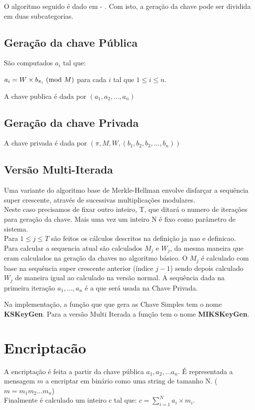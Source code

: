 \documentclass[11pt, language=portuguese]{report}
\begin{document}
O algoritmo seguido é dado em - \autocite{handbook}.
Com isto, a geração da chave pode ser dividida em duas subcategorias.

\subsection{Geração da chave Pública}
\begin{definition}\label{def:4}
	São computados ${a_i}$ tal que:
	\begin{center}
		$a_i = W \times b_{\pi_i} \ (\mathrm{mod}\ M)$ para cada $i$ tal que $1 \le i \le n$.
        \end{center}
\end{definition}
A chave publica é dada por $({a_1, a_2, ..., a_n})$

\subsection{Geração da chave Privada}
A chave privada é dada por $(\pi, M, W, {(b_1, b_2, b_3, ..., b_n)})$

\subsection{Versão Multi-Iterada}
Uma variante do algoritmo base de Merkle-Hellman envolve disfarçar a sequência super crescente, através de sucessivas multiplicações modulares.
\\
Neste caso precisamos de fixar outro inteiro, T, que ditará o numero de iterações para geração da chave.
Mais uma vez um inteiro N é fixo como parâmetro de sistema.
\\

Para $1 \le j \le T$ são feitos os cálculos descritos na definição ja nao e definicao. Para calcular a sequencia atual são calculados $M_j$ e $W_j$, da mesma maneira que eram calculados na geração da chaves no algoritmo básico. O $M_j$ é calculado com base na sequência super crescente anterior (índice $j-1$) sendo depois calculado $W_j$ de maneira igual ao calculado na versão normal. A sequência dada na primeira iteração ${a_1, ..., a_n}$ é a que será usada na Chave Privada.

Na implementação, a função que que gera as Chave Simples tem o nome \textbf{KSKeyGen}. Para a versão Multi Iterada a função tem o nome \textbf{MIKSKeyGen}.
\section{Encriptacão}
A encriptação é feita a partir da chave pública $a_1, a_2, ... a_n$. É representada a mensagem $m$ a encriptar em binário como uma string de tamanho N. ($m = m_1 m_2 ... m_n$)
\\
Finalmente é calculado um inteiro c tal que:
    $c = \sum_{i = 1}^{N} a_i \times m_i$.
\end{document}
